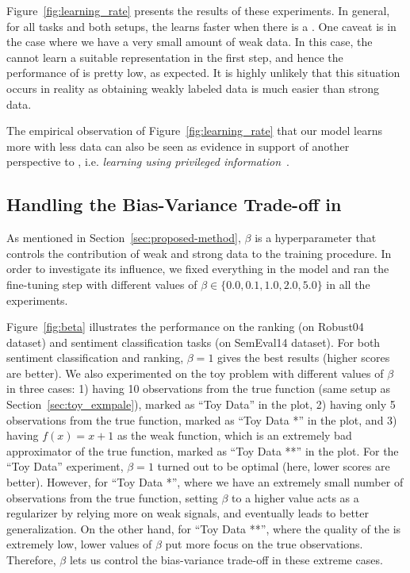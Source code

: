 Figure~\ref{fig:learning_rate} presents the results of these experiments. In general, for all tasks and both setups, the \std learns faster when there is a \tch.
One caveat is in the case where we have a very small amount of weak data. In this case, the \std cannot learn a suitable representation in the first step, and hence the performance of \fwl is pretty low, as expected. It is highly unlikely that this situation occurs in reality as obtaining weakly labeled data is much easier than strong data.

The empirical observation of Figure~\ref{fig:learning_rate} that our model learns more with less data can also be seen as evidence in support of another perspective to \fwl, i.e. \emph{learning using privileged information}~\citep{vapnik2015learning}. 


\subsection{Handling the Bias-Variance Trade-off in \fwl}
\label{sec:bias-variance}
As mentioned in Section~\ref{sec:proposed-method}, $\beta$ is a hyperparameter that controls the contribution of weak and strong data to the training procedure. In order to investigate its influence, we fixed everything in the model and ran the fine-tuning step with different values of $\beta \in \{0.0, 0.1, 1.0, 2.0, 5.0\}$ in all the experiments.


Figure~\ref{fig:beta} illustrates the performance on the ranking (on Robust04 dataset) and sentiment classification tasks (on SemEval14 dataset).  For both sentiment classification and ranking, $\beta=1$ gives the best results (higher scores are better).
%
We also experimented on the toy problem with different values of $\beta$ in three cases: 
1) having 10 observations from the true function (same setup as Section~\ref{sec:toy_exmpale}), marked as ``Toy Data'' in the plot, 
2) having only 5 observations from the true function, marked as ``Toy Data *'' in the plot, and 
3) having $f(x) = x + 1$ as the weak function, which is an extremely bad approximator of the true function, marked as ``Toy Data **'' in the plot.
%
For the ``Toy Data'' experiment, $\beta=1$ turned out to be optimal (here, lower scores are better). However, for ``Toy Data *'', where we have an extremely small number of observations from the true function, setting $\beta$ to a higher value acts as a regularizer by relying more on weak signals, and eventually leads to better generalization. 
On the other hand, for ``Toy Data **'', where the quality of the \wa is extremely low, lower values of $\beta$ put more focus on the true observations. Therefore, $\beta$ lets us control the bias-variance trade-off in these extreme cases.

